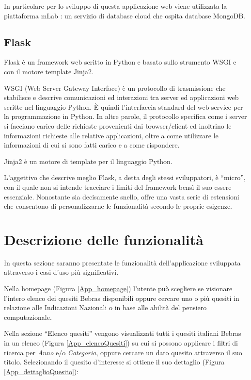 \documentclass[12pt]{report}
\begin{document}
In particolare per lo sviluppo di questa applicazione web viene utilizzata la piattaforma mLab \cite{mLab}: un servizio di database cloud che ospita database MongoDB.


\subsection{Flask}
Flask è un framework web scritto in Python e basato sullo strumento WSGI e con il motore template Jinja2.

WSGI (Web Server Gateway Interface) è un protocollo di trasmissione che stabilisce e descrive comunicazioni ed interazioni tra server ed applicazioni web scritte nel linguaggio Python. \`{E} quindi l'interfaccia standard del web service per la programmazione in Python.
In altre parole, il protocollo specifica come i server si facciano carico delle richieste provenienti dai browser/client ed inoltrino le informazioni richieste alle relative applicazioni, oltre a come utilizzare le informazioni di cui si sono fatti carico e a come rispondere.

Jinja2 è un motore di template per il linguaggio Python.


L’aggettivo che descrive meglio Flask, a detta degli stessi sviluppatori, è “micro”, con il quale non si intende tracciare i limiti del framework bensì il suo essere essenziale. Nonostante sia decisamente snello, offre una vasta serie di estensioni che consentono di personalizzarne le funzionalità secondo le proprie esigenze.

\section{Descrizione delle funzionalità}
In questa sezione saranno presentate le funzionalità dell'applicazione sviluppata attraverso i casi d'uso più significativi.


Nella homepage (Figura \ref{App_homepage}) l'utente può scegliere se visionare l'intero elenco dei quesiti Bebras disponibili oppure cercare uno o più quesiti in relazione alle Indicazioni Nazionali o in base alle abilità del pensiero computazionale.


Nella sezione ``Elenco quesiti'' vengono visualizzati tutti i quesiti italiani Bebras in un elenco (Figura  \ref{App_elencoQuesiti}) su cui si possono applicare i filtri di ricerca per \textit{Anno} e/o \textit{Categoria}, oppure cercare un dato quesito attraverso il suo titolo.
Selezionando il quesito d'interesse si ottiene il suo dettaglio (Figura \ref{App_dettaglioQuesito}):
\end{document}
